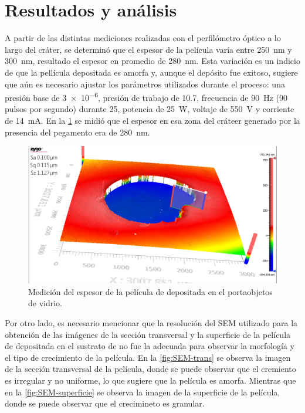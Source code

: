 \documentclass[12pt]{IEEEtran}
\begin{document}
\section{Resultados y análisis}

A partir de las distintas mediciones realizadas con el perfilómetro óptico a lo largo del cráter, se determinó que el espesor de la película varía entre \qty{250}{\nm} y \qty{300}{\nm}, resultado el espesor en promedio de \qty{280}{\nm}. Esta variación es un indicio de que la pellícula depositada es amorfa y, aunque el depósito fue exitoso, sugiere que aún es necesario ajustar los parámetros utilizados durante el proceso: una presión base de \qty{3e-6}{\Torr}, presión de trabajo de \qty{10.7}{\mTorr}, frecuencia de \qty{90}{\Hz} (90 pulsos por segundo) durante \qty{25}{\min}, potencia de \qty{25}{\W}, voltaje de \qty{550}{\V} y corriente de \qty{14}{\mA}. En la \cref{fig:OP-grosor} se midió que el espesor en esa zona del cráteer generado por la presencia del pegamento era de \qty{280}{\nm}.

\begin{figure}[htp]
	\centering
	\includegraphics[width=0.8\linewidth]{OP-grosor}
	\caption{Medición del espesor de la película de  depositada en el portaobjetos de vidrio.}
	\label{fig:OP-grosor}
\end{figure}

Por otro lado, es necesario mencionar que la resolución del SEM utilizado para la obtención de las imágenes de la sección transversal y la superficie de la película de  depositada en el sustrato de  no fue la adecuada para observar la morfología y el tipo de crecimiento de la película. En la \cref{fig:SEM-trans} se observa la imagen de la sección transversal de la película, donde se puede observar que el cremiento es irregular y no uniforme, lo que sugiere que la película es amorfa. Mientras que en la \cref{fig:SEM-superficie} se observa la imagen de la superficie de la película, donde se puede observar que el crecimineto es granular.
\end{document}
